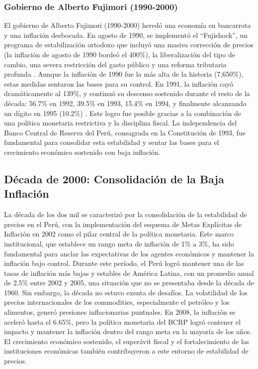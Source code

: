 \documentclass[
  stu,
  floatsintext,
  longtable,
  a4paper,
  nolmodern,
  notxfonts,
  notimes,
  12pt,
  colorlinks=true,linkcolor=blue,citecolor=blue,urlcolor=blue]{apa7}
\begin{document}
\subsubsection{Gobierno de Alberto Fujimori
(1990-2000)}\label{gobierno-de-alberto-fujimori-1990-2000}

El gobierno de Alberto Fujimori (1990-2000) heredó una economía en
bancarrota y una inflación desbocada. En agosto de 1990, se implementó
el ``Fujishock'', un programa de estabilización ortodoxo que incluyó una
masiva corrección de precios (la inflación de agosto de 1990 bordeó el
400\%), la liberalización del tipo de cambio, una severa restricción del
gasto público y una reforma tributaria profunda . Aunque la inflación de
1990 fue la más alta de la historia (7,650\%), estas medidas sentaron
las bases para su control. En 1991, la inflación cayó dramáticamente al
139\%, y continuó su descenso sostenido durante el resto de la década:
56.7\% en 1992, 39.5\% en 1993, 15.4\% en 1994, y finalmente alcanzando
un dígito en 1995 (10.2\%) . Este logro fue posible gracias a la
combinación de una política monetaria restrictiva y la disciplina
fiscal. La independencia del Banco Central de Reserva del Perú,
consagrada en la Constitución de 1993, fue fundamental para consolidar
esta estabilidad y sentar las bases para el crecimiento económico
sostenido con baja inflación.

\subsection{Década de 2000: Consolidación de la Baja
Inflación}\label{duxe9cada-de-2000-consolidaciuxf3n-de-la-baja-inflaciuxf3n}

La década de los dos mil se caracterizó por la consolidación de la
estabilidad de precios en el Perú, con la implementación del esquema de
Metas Explícitas de Inflación en 2002 como el pilar central de la
política monetaria. Este marco institucional, que establece un rango
meta de inflación de 1\% a 3\%, ha sido fundamental para anclar las
expectativas de los agentes económicos y mantener la inflación bajo
control. Durante este período, el Perú logró mantener una de las tasas
de inflación más bajas y estables de América Latina, con un promedio
anual de 2.5\% entre 2002 y 2005, una situación que no se presentaba
desde la década de 1960. Sin embargo, la década no estuvo exenta de
desafíos. La volatilidad de los precios internacionales de los
commodities, especialmente el petróleo y los alimentos, generó presiones
inflacionarias puntuales. En 2008, la inflación se aceleró hasta el
6.65\%, pero la política monetaria del BCRP logró contener el impacto y
mantener la inflación dentro del rango meta en la mayoría de los años.
El crecimiento económico sostenido, el superávit fiscal y el
fortalecimiento de las instituciones económicas también contribuyeron a
este entorno de estabilidad de precios.
\end{document}
